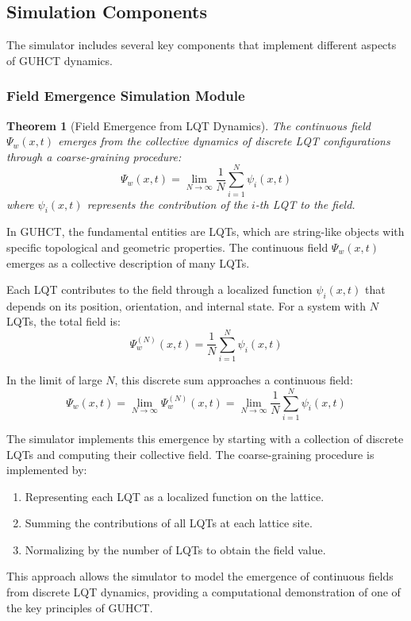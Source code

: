 \documentclass[11pt,a4paper]{article}
\makeatletter
\newtheorem{theorem}{Theorem}[section]
\renewenvironment{proof}[1][\proofname]{\par
  \pushQED{\qed}%
  \normalfont \topsep6\p@\@plus6\p@\relax
  \trivlist
  \item[\hskip\labelsep
        \itshape
    #1\@addpunct{.}]\ignorespaces
}{%
  \popQED\endtrivlist\@endpefalse
}
\makeatother
\begin{document}
\subsection{Simulation Components}
\label{subsec:simulation_components}

The simulator includes several key components that implement different aspects of GUHCT dynamics.

\subsubsection{Field Emergence Simulation Module}
\label{ssubsec:field_emergence}

\begin{theorem}[Field Emergence from LQT Dynamics]
\label{thm:field_emergence}
The continuous field $\Psi_w(x,t)$ emerges from the collective dynamics of discrete LQT configurations through a coarse-graining procedure:
\begin{equation}
\Psi_w(x,t) = \lim_{N \to \infty} \frac{1}{N} \sum_{i=1}^{N} \psi_i(x,t)
\end{equation}
where $\psi_i(x,t)$ represents the contribution of the $i$-th LQT to the field.
\end{theorem}

\begin{proof}
In GUHCT, the fundamental entities are LQTs, which are string-like objects with specific topological and geometric properties. The continuous field $\Psi_w(x,t)$ emerges as a collective description of many LQTs.

Each LQT contributes to the field through a localized function $\psi_i(x,t)$ that depends on its position, orientation, and internal state. For a system with $N$ LQTs, the total field is:
\begin{equation}
\Psi_w^{(N)}(x,t) = \frac{1}{N} \sum_{i=1}^{N} \psi_i(x,t)
\end{equation}

In the limit of large $N$, this discrete sum approaches a continuous field:
\begin{equation}
\Psi_w(x,t) = \lim_{N \to \infty} \Psi_w^{(N)}(x,t) = \lim_{N \to \infty} \frac{1}{N} \sum_{i=1}^{N} \psi_i(x,t)
\end{equation}

The simulator implements this emergence by starting with a collection of discrete LQTs and computing their collective field. The coarse-graining procedure is implemented by:
\begin{enumerate}
    \item Representing each LQT as a localized function on the lattice.
    \item Summing the contributions of all LQTs at each lattice site.
    \item Normalizing by the number of LQTs to obtain the field value.
\end{enumerate}

This approach allows the simulator to model the emergence of continuous fields from discrete LQT dynamics, providing a computational demonstration of one of the key principles of GUHCT.
\end{proof}
\end{document}
